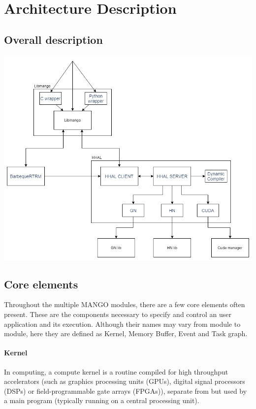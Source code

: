 \chapter{Architecture Description}

\section{Overall description}

\includegraphics[scale=0.5]{img/architecture.png}

\section{Core elements}
Throughout the multiple MANGO modules, there are a few core elements often present. These are the components necessary to specify and control an user application and its execution. Although their names may vary from module to module, here they are defined as Kernel, Memory Buffer, Event and Task graph.

\subsubsection{Kernel}
In computing, a compute kernel is a routine compiled for high throughput accelerators (such as graphics processing units (GPUs), digital signal processors (DSPs) or field-programmable gate arrays (FPGAs)), separate from but used by a main program (typically running on a central processing unit). \cite{kernel_wikipedia}

